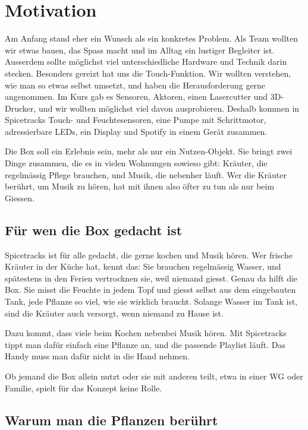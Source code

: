 \documentclass[11pt,a4paper]{article}
\begin{document}
\section{Motivation}

Am Anfang stand eher ein Wunsch als ein konkretes Problem. Als Team wollten wir etwas bauen, das Spass macht und im Alltag ein lustiger Begleiter ist. Ausserdem sollte möglichst viel unterschiedliche Hardware und Technik darin stecken. Besonders gereizt hat uns die Touch-Funktion. Wir wollten verstehen, wie man so etwas selbst umsetzt, und haben die Herausforderung gerne angenommen. Im Kurs gab es Sensoren, Aktoren, einen Lasercutter und 3D-Drucker, und wir wollten möglichst viel davon ausprobieren. Deshalb kommen in Spicetracks Touch- und Feuchtesensoren, eine Pumpe mit Schrittmotor, adressierbare LEDs, ein Display und Spotify in einem Gerät zusammen.

Die Box soll ein Erlebnis sein, mehr als nur ein Nutzen-Objekt. Sie bringt zwei Dinge zusammen, die es in vielen Wohnungen sowieso gibt: Kräuter, die regelmässig Pflege brauchen, und Musik, die nebenher läuft. Wer die Kräuter berührt, um Musik zu hören, hat mit ihnen also öfter zu tun als nur beim Giessen.

\subsection{Für wen die Box gedacht ist}

Spicetracks ist für alle gedacht, die gerne kochen und Musik hören. Wer frische Kräuter in der Küche hat, kennt das: Sie brauchen regelmässig Wasser, und spätestens in den Ferien vertrocknen sie, weil niemand giesst. Genau da hilft die Box. Sie misst die Feuchte in jedem Topf und giesst selbst aus dem eingebauten Tank, jede Pflanze so viel, wie sie wirklich braucht. Solange Wasser im Tank ist, sind die Kräuter auch versorgt, wenn niemand zu Hause ist.

Dazu kommt, dass viele beim Kochen nebenbei Musik hören. Mit Spicetracks tippt man dafür einfach eine Pflanze an, und die passende Playlist läuft. Das Handy muss man dafür nicht in die Hand nehmen.

Ob jemand die Box allein nutzt oder sie mit anderen teilt, etwa in einer WG oder Familie, spielt für das Konzept keine Rolle.

\subsection{Warum man die Pflanzen berührt}
\end{document}

